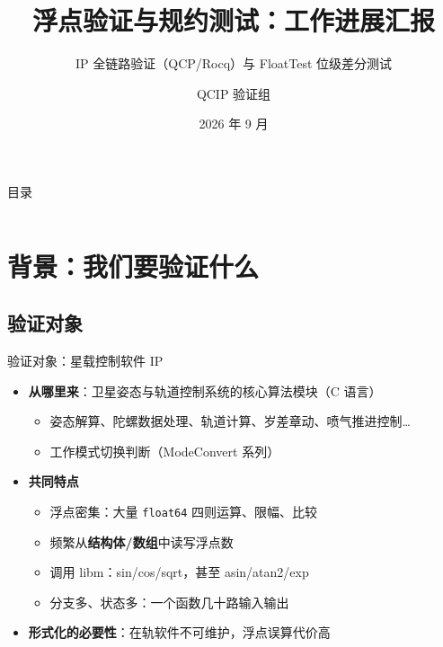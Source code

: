 \documentclass[UTF8,aspectratio=169]{ctexbeamer}
\title[浮点验证与规约测试进展]{浮点验证与规约测试：工作进展汇报}
\subtitle{IP 全链路验证（QCP/Rocq）与 FloatTest 位级差分测试}
\author{QCIP 验证组}
\date{2026 年 9 月}
\begin{document}
\begin{frame}
  \titlepage
\end{frame}

\begin{frame}{目录}
  \begin{columns}[T]
    {\scriptsize \tableofcontents[sections={1-2}]}
    {\scriptsize \tableofcontents[sections={3-4}]}
  \end{columns}
\end{frame}

\section{背景：我们要验证什么}

\subsection{验证对象}
\begin{frame}{验证对象：星载控制软件 IP}
  \begin{itemize}
    \item \textbf{从哪里来}：卫星姿态与轨道控制系统的核心算法模块（C 语言）
      \begin{itemize}
        \item 姿态解算、陀螺数据处理、轨道计算、岁差章动、喷气推进控制\ldots
        \item 工作模式切换判断（ModeConvert 系列）
      \end{itemize}
    \item \textbf{共同特点}
      \begin{itemize}
        \item \alert{浮点密集}：大量 \texttt{float64} 四则运算、限幅、比较
        \item 频繁从\textbf{结构体/数组}中读写浮点数
        \item 调用 libm：sin/cos/sqrt，甚至 asin/atan2/exp
        \item 分支多、状态多：一个函数几十路输入输出
      \end{itemize}
    \item \textbf{形式化的必要性}：在轨软件不可维护，浮点误算代价高
  \end{itemize}
\end{frame}
\end{document}
